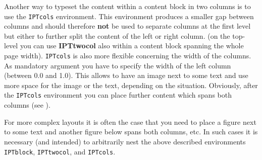 


Another way to typeset the content within a content block in two columns is to use the \texttt{IPTcols} environment. This environment produces a smaller gap between columns and should therefore \textbf{not} be used to separate columns at the first level but either to further split the content of the left or right column. (on the top-level you can use \textbf{IPTtwocol} also within a content block spanning the whole page width). \texttt{IPTcols} is also more flexible concerning the width of the columns. As mandatory argument you have to specify the width of the left column (between 0.0 and 1.0). This allows to have an image next to some text and use more space for the image or the text, depending on the situation. Obviously, after the \texttt{IPTcols} environment you can place further content which spans both columns (see ). 




For more complex layouts it is often the case that you need to place a figure next to some text and another figure below spans both columns, etc. In such cases it is necessary (and intended) to arbitrarily nest the above described environments \texttt{IPTblock}, \texttt{IPTtwocol}, and \texttt{IPTcols}.


